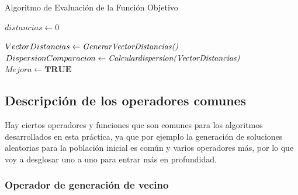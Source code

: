 \documentclass{article}
\begin{document}
\begin{algorithm}
  \scriptsize
  \label{Algoritmo de Evaluacion de la Funcion Objetivo}
  \caption{Algoritmo de Evaluación de la Función Objetivo}
  $distancias \leftarrow 0$\\
  
\vspace{3mm}

\vspace{3mm}
$Vector Distancias \leftarrow{\emph{GenerarVectorDistancias()}}$\\
$Dispersion Comparacion \leftarrow{\emph{Calculardispersion(VectorDistancias)}}$\\
\vspace{3mm}
$Mejora \leftarrow {\textbf{TRUE}}$\\

\end{algorithm}

\subsection{\normalsize Descripción de los operadores comunes}
Hay ciertos operadores y funciones que son comunes para los algoritmos desarrollados en esta práctica,
ya que por ejemplo la generación de soluciones aleatorias para la población inicial es común y varios operadores 
más, por lo que voy a desglosar uno a uno para entrar más en profundidad.

\subsubsection{\small Operador de generación de vecino}

\vspace{3mm}
\end{document}
